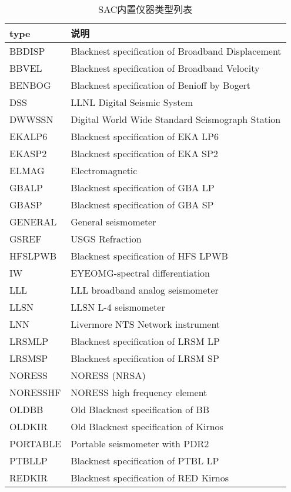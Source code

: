 \begin{table}[tp]
\centering
\ttfamily
\small
\caption{SAC内置仪器类型列表}
\label{table:instrument-type}
\begin{tabular}{ll}
\toprule
type     &  说明  \\
\midrule
BBDISP   &  Blacknest specification of Broadband Displacement \\
BBVEL    &  Blacknest specification of Broadband Velocity   \\
BENBOG   &  Blacknest specification of Benioff by Bogert    \\
DSS      &  LLNL Digital Seismic System \\
DWWSSN   &  Digital World Wide Standard Seismograph Station \\
EKALP6   &  Blacknest specification of EKA LP6  \\
EKASP2   &  Blacknest specification of EKA SP2  \\
ELMAG    &  Electromagnetic \\
GBALP    &  Blacknest specification of GBA LP   \\
GBASP    &  Blacknest specification of GBA SP   \\
GENERAL  &  General seismometer \\
GSREF    &  USGS Refraction \\
HFSLPWB  &  Blacknest specification of HFS LPWB \\
IW       &  EYEOMG-spectral differentiation \\
LLL      &  LLL broadband analog seismometer    \\
LLSN     &  LLSN L-4 seismometer    \\
LNN      &  Livermore NTS Network instrument    \\
LRSMLP   &  Blacknest specification of LRSM LP  \\
LRSMSP   &  Blacknest specification of LRSM SP  \\
NORESS   &  NORESS (NRSA)   \\
NORESSHF &  NORESS high frequency element   \\
OLDBB    &  Old Blacknest specification of BB   \\
OLDKIR   &  Old Blacknest specification of Kirnos   \\
PORTABLE &  Portable seismometer with PDR2  \\
PTBLLP   &  Blacknest specification of PTBL LP  \\
REDKIR   &  Blacknest specification of RED Kirnos   \\

\end{tabular}
\end{table}

